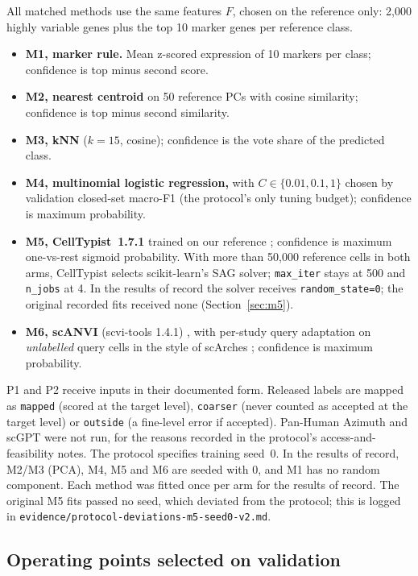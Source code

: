 \documentclass[11pt]{article}
\newcommand{\code}[1]{\texttt{#1}}
\begin{document}
All matched methods use the same features $F$, chosen on the reference only: 2{,}000 highly variable genes plus the top 10 marker genes per reference class.
\begin{itemize}
\item \textbf{M1, marker rule.} Mean z-scored expression of 10 markers per class; confidence is top minus second score.
\item \textbf{M2, nearest centroid} on 50 reference PCs with cosine similarity; confidence is top minus second similarity.
\item \textbf{M3, kNN} ($k=15$, cosine); confidence is the vote share of the predicted class.
\item \textbf{M4, multinomial logistic regression,} with $C\in\{0.01,0.1,1\}$ chosen by validation closed-set macro-F1 (the protocol's only tuning budget); confidence is maximum probability.
\item \textbf{M5, CellTypist~1.7.1} trained on our reference \citep{dominguezconde2022celltypist}; confidence is maximum one-vs-rest sigmoid probability. With more than 50{,}000 reference cells in both arms, CellTypist selects scikit-learn's SAG solver; \code{max\_iter} stays at 500 and \code{n\_jobs} at 4. In the results of record the solver receives \code{random\_state=0}; the original recorded fits received none (Section~\ref{sec:m5}).
\item \textbf{M6, scANVI} (scvi-tools 1.4.1) \citep{xu2021scanvi}, with per-study query adaptation on \emph{unlabelled} query cells in the style of scArches \citep{lotfollahi2022scarches}; confidence is maximum probability.
\end{itemize}
P1 and P2 receive inputs in their documented form. Released labels are mapped as \texttt{mapped} (scored at the target level), \texttt{coarser} (never counted as accepted at the target level) or \texttt{outside} (a fine-level error if accepted). Pan-Human Azimuth \citep{sarkar2026panhuman} and scGPT \citep{cui2024scgpt} were not run, for the reasons recorded in the protocol's access-and-feasibility notes. The protocol specifies training seed~0. In the results of record, M2/M3 (PCA), M4, M5 and M6 are seeded with 0, and M1 has no random component. Each method was fitted once per arm for the results of record. The original M5 fits passed no seed, which deviated from the protocol; this is logged in \nolinkurl{evidence/protocol-deviations-m5-seed0-v2.md}.

\subsection{Operating points selected on validation}\label{sec:ops}
\end{document}
